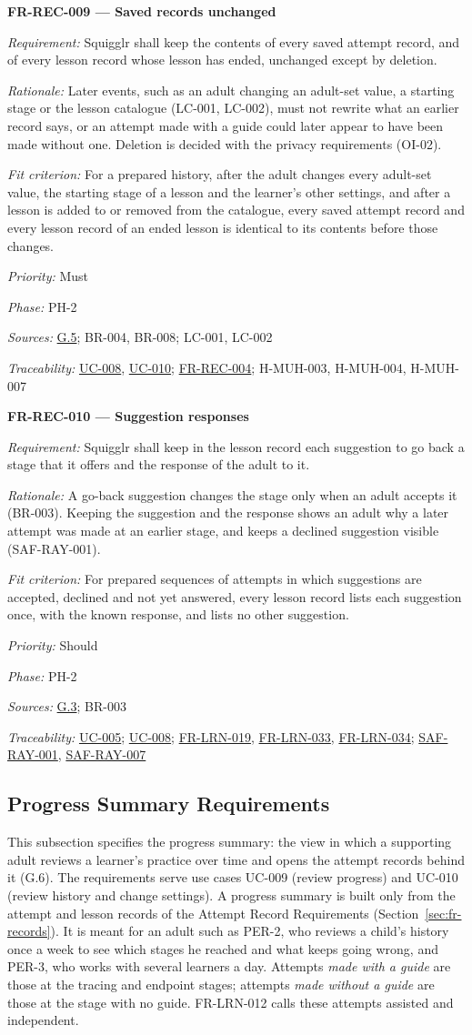 \documentclass[12pt]{article}
\renewcommand{\_}{\textunderscore\allowbreak}%
\newcommand{\goalref}[1]{\hyperref[goal:#1]{G.#1}}
\newcommand{\ucref}[1]{\hyperref[uc:#1]{\mbox{UC-#1}}}
\newenvironment{srsrequirement}[2]{%
  \par\medskip\noindent\phantomsection\label{req:#1}%
  \textbf{#1 --- #2}\par\nobreak\smallskip }{\par\medskip}
\newcommand{\reqfield}[2]{\noindent\textit{#1:} #2\par}
\newcommand{\reqshall}[1]{\reqfield{Requirement}{#1}}
\newcommand{\reqrationale}[1]{\reqfield{Rationale}{#1}}
\newcommand{\reqfit}[1]{\reqfield{Fit criterion}{#1}}
\newcommand{\reqpriority}[1]{\reqfield{Priority}{#1}}
\newcommand{\reqphase}[1]{\reqfield{Phase}{#1}}
\newcommand{\reqsources}[1]{\reqfield{Sources}{#1}}
\newcommand{\reqtraces}[1]{\reqfield{Traceability}{#1}}
\newcommand{\reqref}[1]{\hyperref[req:#1]{#1}}
\providecommand{\ucref}[1]{\hyperref[uc:#1]{UC-#1}}
\begin{document}
\begin{srsrequirement}{FR-REC-009}{Saved records unchanged}
  \reqshall{Squigglr shall keep the contents of every saved attempt record, and
of every lesson record whose lesson has ended, unchanged except by deletion.}
\reqrationale{Later events, such as an adult changing an adult-set value, a
starting stage or the lesson catalogue (LC-001, LC-002), must not rewrite what
an earlier record says, or an attempt made with a guide could later appear to
have been made without one. Deletion is decided with the privacy requirements
(OI-02).} \reqfit{For a prepared history, after the adult changes every
adult-set value, the starting stage of a lesson and the learner's other
settings, and after a lesson is added to or removed from the catalogue, every
saved attempt record and every lesson record of an ended lesson is identical to
its contents before those changes.}
  \reqpriority{Must}
  \reqphase{PH-2}
  \reqsources{\goalref{5}; BR-004, BR-008; LC-001, LC-002}
  \reqtraces{\ucref{008}, \ucref{010}; \reqref{FR-REC-004}; H-MUH-003,
  H-MUH-004, H-MUH-007}
\end{srsrequirement}

\begin{srsrequirement}{FR-REC-010}{Suggestion responses}
  \reqshall{Squigglr shall keep in the lesson record each suggestion to go back
a stage that it offers and the response of the adult to it.} \reqrationale{A
go-back suggestion changes the stage only when an adult accepts it (BR-003).
Keeping the suggestion and the response shows an adult why a later attempt was
made at an earlier stage, and keeps a declined suggestion visible
(SAF-RAY-001).} \reqfit{For prepared sequences of attempts in which suggestions
are accepted, declined and not yet answered, every lesson record lists each
suggestion once, with the known response, and lists no other suggestion.}
  \reqpriority{Should}
  \reqphase{PH-2}
  \reqsources{\goalref{3}; BR-003} \reqtraces{\ucref{005}; \ucref{008};
  \reqref{FR-LRN-019}, \reqref{FR-LRN-033}, \reqref{FR-LRN-034}; \reqref{SAF-RAY-001}, \reqref{SAF-RAY-007}}
\end{srsrequirement}

\subsection{Progress Summary Requirements}
\label{sec:fr-progress}

This subsection specifies the progress summary: the view in which a supporting
adult reviews a learner's practice over time and opens the attempt records
behind it (G.6). The requirements serve use cases UC-009 (review progress) and
UC-010 (review history and change settings). A progress summary is built only
from the attempt and lesson records of the Attempt Record Requirements
(Section~\ref{sec:fr-records}). It is meant for an adult such as PER-2, who
reviews a child's history once a week to see which stages he reached and what
keeps going wrong, and PER-3, who works with several learners a day. Attempts
\emph{made with a guide} are those at the tracing and endpoint stages; attempts
\emph{made without a guide} are those at the stage with no guide. FR-LRN-012
calls these attempts assisted and independent.
\end{document}
